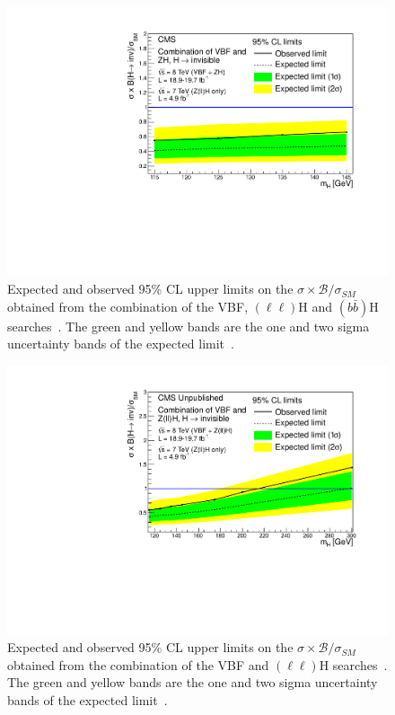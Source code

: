 \begin{figure}
  \includegraphics[width=\largefigwidth]{plots/prompt/HIG-13-30-figs/combinedlimit.pdf}
  \caption{Expected and observed 95\% \ac{CL} upper limits on the $\sigma\times\mathcal{B}/\sigma_{SM}$ obtained from the combination of the \ac{VBF}, \PZ$(\ell\ell)$H and \PZ$(b\bar{b})$H searches~\cite{Chatrchyan:2014tja}. The green and yellow bands are the one and two sigma uncertainty bands of the expected limit~\cite{Chatrchyan:2014tja}.}
  \label{fig:promptcomb}
\end{figure}

\begin{figure}
  \includegraphics[width=\largefigwidth]{plots/prompt/HIG-13-30-figs/highmasslimit.pdf}
  \caption{Expected and observed 95\% \ac{CL} upper limits on the $\sigma\times\mathcal{B}/\sigma_{SM}$ obtained from the combination of the \ac{VBF} and \PZ$(\ell\ell)$H searches~\cite{Chatrchyan:2014tja}. The green and yellow bands are the one and two sigma uncertainty bands of the expected limit~\cite{Chatrchyan:2014tja}.}
  \label{fig:promptcombhighmass}
\end{figure}

